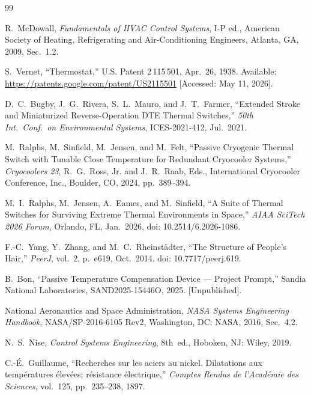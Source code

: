 \documentclass[12pt, letterpaper]{report}%
\begin{document}
\begin{thebibliography}{99}

	R.\ McDowall, \textit{Fundamentals of HVAC Control Systems}, I-P ed.,
	American Society of Heating, Refrigerating and Air-Conditioning Engineers,
	Atlanta, GA, 2009, Sec.~1.2.

	S.\ Vernet, ``Thermostat,'' U.S. Patent 2\,115\,501, Apr.\ 26, 1938.
	Available: \url{https://patents.google.com/patent/US2115501}
	[Accessed: May 11, 2026].

	D.\ C.\ Bugby, J.\ G.\ Rivera, S.\ L.\ Mauro, and J.\ T.\ Farmer,
	``Extended Stroke and Miniaturized Reverse-Operation DTE Thermal Switches,''
	\textit{50th Int.\ Conf.\ on Environmental Systems}, ICES-2021-412, Jul.\ 2021.

	M.\ Ralphs, M.\ Sinfield, M.\ Jensen, and M.\ Felt,
	``Passive Cryogenic Thermal Switch with Tunable Close Temperature for
	Redundant Cryocooler Systems,''
	\textit{Cryocoolers 23}, R.\ G.\ Ross, Jr. and J.\ R.\ Raab, Eds.,
	International Cryocooler Conference, Inc., Boulder, CO, 2024, pp.~389--394.

	M.\ I.\ Ralphs, M.\ Jensen, A.\ Eames, and M.\ Sinfield,
	``A Suite of Thermal Switches for Surviving Extreme Thermal Environments in Space,''
	\textit{AIAA SciTech 2026 Forum}, Orlando, FL, Jan.\ 2026,
	doi: 10.2514/6.2026-1086.

	F.-C.\ Yang, Y.\ Zhang, and M.\ C.\ Rheinstädter,
	``The Structure of People's Hair,''
	\textit{PeerJ}, vol.~2, p.~e619, Oct.\ 2014. doi: 10.7717/peerj.619.

	B.\ Bon,
	``Passive Temperature Compensation Device --- Project Prompt,''
	Sandia National Laboratories, SAND2025-15446O, 2025. [Unpublished].

	National Aeronautics and Space Administration,
	\textit{NASA Systems Engineering Handbook}, NASA/SP-2016-6105 Rev2,
	Washington, DC: NASA, 2016, Sec.~4.2.

	N.\ S.\ Nise, \textit{Control Systems Engineering},
	8th~ed., Hoboken, NJ: Wiley, 2019.

	C.-\'{E}.\ Guillaume,
	``Recherches sur les aciers au nickel. Dilatations aux temp\'{e}ratures
	\'{e}lev\'{e}es; r\'{e}sistance \'{e}lectrique,''
	\textit{Comptes Rendus de l'Acad\'{e}mie des Sciences},
	vol.~125, pp.~235--238, 1897.


\end{thebibliography}
\end{document}
